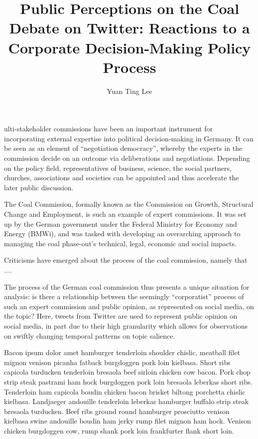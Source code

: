 \documentclass[9pt,twocolumn,twoside,lineno]{pnas-new}
\title{Public Perceptions on the Coal Debate on Twitter: Reactions to a Corporate Decision-Making Policy Process}
\author[a,b,1]{Yuan Ting Lee}
\affil[a]{Hertie School, Friedrichstr. 180, Berlin 10117, Germany}
\affil[b]{Mercator Research Institute on Global Commons and Climate Change, Torgauer Str. 12 - 15, Berlin 10829, Germany}
\begin{document}
\maketitle
\thispagestyle{firststyle}

ulti-stakeholder commissions have been an important instrument for incorporating external expertise into political decision-making in Germany. It can be seen as an element of ``negotiation democracy”, whereby the experts in the commission decide on an outcome via deliberations and negotiations. Depending on the policy field, representatives of business, science, the social partners, churches, associations and societies can be appointed and thus accelerate the later public discussion. \cite{Siefken2016}

The Coal Commission, formally known as the Commission on Growth, Structural Change and Employment, is such an example of expert commissions. It was set up by the German government under the Federal Ministry for Economy and Energy (BMWi), and was tasked with developing an overarching approach to managing the coal phase-out’s technical, legal, economic and social impacts.

Criticisms have emerged about the process of the coal commission, namely that ....

The process of the German coal commission thus presents a unique situation for analysis: is there a relationship between the seemingly ``corporatist” process of such an expert commission and public opinion, as represented on social media, on the topic? Here, tweets from Twitter are used to represent public opinion on social media, in part due to their high granularity which allows for observations on swiftly changing temporal patterns on topic salience.

Bacon ipsum dolor amet hamburger tenderloin shoulder chislic, meatball filet mignon venison picanha fatback burgdoggen pork loin kielbasa. Short ribs capicola turducken tenderloin bresaola beef sirloin chicken cow bacon. Pork chop strip steak pastrami ham hock burgdoggen pork loin bresaola leberkas short ribs. Tenderloin ham capicola boudin chicken bacon brisket biltong porchetta chislic kielbasa. Landjaeger andouille tenderloin leberkas hamburger buffalo strip steak bresaola turducken. Beef ribs ground round hamburger prosciutto venison kielbasa swine andouille boudin ham jerky rump filet mignon ham hock. Venison chicken burgdoggen cow, rump shank pork loin frankfurter flank short loin.
\end{document}
